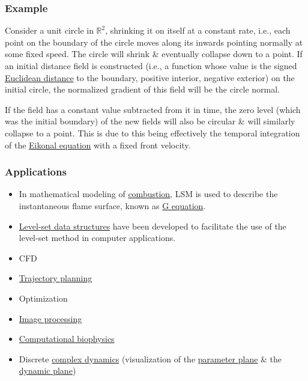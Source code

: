 \documentclass{article}
\begin{document}
\subsubsection{Example}
Consider a unit circle in $\mathbb{R}^2$, shrinking it on itself at a constant rate, i.e., each point on the boundary of the circle moves along its inwards pointing normally at some fixed speed. The circle will shrink \& eventually collapse down to a point. If an initial distance field is constructed (i.e., a function whose value is the signed \href{https://en.wikipedia.org/wiki/Euclidean_distance}{Euclidean distance} to the boundary, positive interior, negative exterior) on the initial circle, the normalized gradient of this field will be the circle normal.

If the field has a constant value subtracted from it in time, the zero level (which was the initial boundary) of the new fields will also be circular \& will similarly collapse to a point. This is due to this being effectively the temporal integration of the \href{https://en.wikipedia.org/wiki/Eikonal_equation}{Eikonal equation} with a fixed front velocity.

\subsubsection{Applications}

\begin{itemize}
	\item In mathematical modeling of \href{https://en.wikipedia.org/wiki/Combustion}{combustion}, LSM is used to describe the instantaneous flame surface, known as \href{https://en.wikipedia.org/wiki/G_equation}{G equation}.
	\item \href{https://en.wikipedia.org/wiki/Level_set_(data_structures)}{Level-set data structures} have been developed to facilitate the use of the level-set method in computer applications.
	\item CFD
	\item \href{https://en.wikipedia.org/wiki/Trajectory}{Trajectory planning}
	\item Optimization
	\item \href{https://en.wikipedia.org/wiki/Image_processing}{Image processing}
	\item \href{https://en.wikipedia.org/wiki/Computational_biophysics}{Computational biophysics}
	\item Discrete \href{https://en.wikipedia.org/wiki/Complex_dynamics}{complex dynamics} (visualization of the \href{https://en.wikibooks.org/wiki/Fractals/Iterations_in_the_complex_plane/Mandelbrot_set}{parameter plane} \& the \href{https://en.wikibooks.org/wiki/Fractals/Iterations_in_the_complex_plane/Julia_set}{dynamic plane})
\end{itemize}
\end{document}
